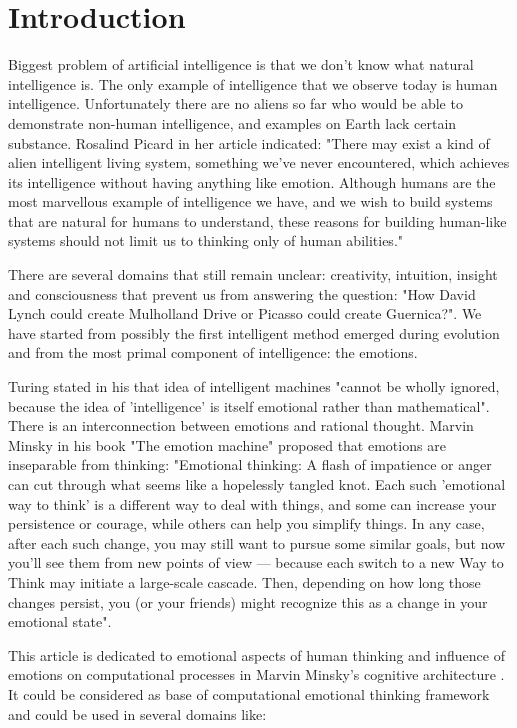 \section{Introduction}

Biggest problem of artificial intelligence is that we don't know what natural intelligence is. The only example of intelligence that we observe today is human intelligence. Unfortunately there are no aliens so far who would be able to demonstrate non-human intelligence, and examples on Earth lack certain substance. Rosalind Picard in her article indicated: "There may exist a kind of alien intelligent living system, something we’ve never encountered, which achieves its  intelligence without having anything like emotion. Although humans are the most marvellous example of intelligence we have, and we wish to build systems that are natural for humans to understand, these reasons for building human-like systems should not limit us to thinking only of human abilities." \cite{affectivecomputingchallanges}

There are several domains that still remain unclear: creativity, intuition, insight and consciousness that prevent us from answering the question: "How David Lynch could create Mulholland Drive or Picasso could create Guernica?".
We have started from possibly the first intelligent method emerged during evolution and from the most primal component of intelligence: the emotions.

Turing stated in his \cite{intelligent_machinery} that idea of intelligent machines "cannot be wholly ignored, because the idea of 'intelligence' is itself emotional rather than mathematical".
There is an interconnection between emotions and rational thought. Marvin Minsky in his book "The emotion machine" proposed that emotions are inseparable from thinking: "Emotional thinking: A flash of impatience or anger can cut through what seems like a hopelessly tangled knot. Each such 'emotional way to think' is a different way to deal with things, and some can increase your persistence or courage, while others can help you simplify things. In any case, after each such change, you may still want to pursue some similar goals, but now you'll see them from new points of view — because each switch to a new Way to Think may initiate a large-scale cascade. Then, depending on how long those changes persist, you (or your friends) might recognize this as a change in your emotional state".

This article is dedicated to emotional aspects of human thinking and influence of emotions on computational processes in Marvin Minsky's cognitive architecture \cite{emotionmachine}. It could be considered as base of computational emotional thinking framework and could be used in several domains like:

